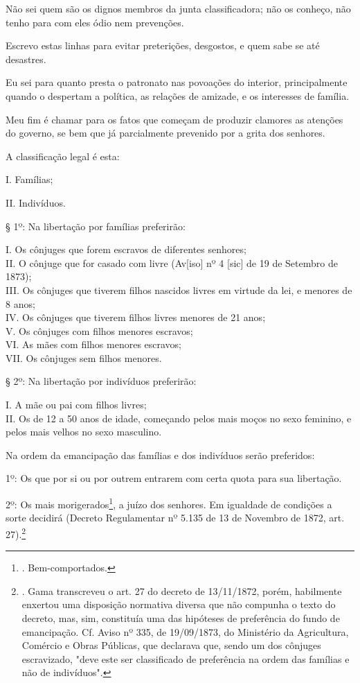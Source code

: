 Não sei quem são os dignos membros da junta classificadora; não os
conheço, não tenho para com eles ódio nem prevenções.

Escrevo estas linhas para evitar preterições, desgostos, e quem sabe se
até desastres.

Eu sei para quanto presta o patronato nas povoações do interior,
principalmente quando o despertam a política, as relações de amizade, e
os interesses de família.

Meu fim é chamar para os fatos que começam de produzir clamores as
atenções do governo, se bem que já parcialmente prevenido por a grita
dos senhores.

A classificação legal é esta:

I. Famílias;

II. Indivíduos.

§ 1º: Na libertação por famílias preferirão:

I. Os cônjuges que forem escravos de diferentes senhores;\\
II. O cônjuge que for casado com livre (Av{[}iso{]} nº 4 {[}sic{]} de 19
de Setembro de 1873);\\
III. Os cônjuges que tiverem filhos nascidos livres em virtude da lei, e
menores de 8 anos;\\
IV. Os cônjuges que tiverem filhos livres menores de 21 anos;\\
V. Os cônjuges com filhos menores escravos;\\
VI. As mães com filhos menores escravos;\\
VII. Os cônjuges sem filhos menores.

§ 2º: Na libertação por indivíduos preferirão:

I. A mãe ou pai com filhos livres;\\
II. Os de 12 a 50 anos de idade, começando pelos mais moços no sexo
feminino, e pelos mais velhos no sexo masculino.

Na ordem da emancipação das famílias e dos indivíduos serão preferidos:

1º: Os que por si ou por outrem entrarem com certa quota para sua
libertação.

2º: Os mais morigerados\footnote{. Bem-comportados.}, a juízo dos
senhores. Em igualdade de condições a sorte decidirá (Decreto
Regulamentar nº 5.135 de 13 de Novembro de 1872, art. 27).\footnote{.
  Gama transcreveu o art. 27 do decreto de 13/11/1872, porém, habilmente
  enxertou uma disposição normativa diversa que não compunha o texto do
  decreto, mas, sim, constituía uma das hipóteses de preferência do
  fundo de emancipação. Cf. Aviso nº 335, de 19/09/1873, do Ministério
  da Agricultura, Comércio e Obras Públicas, que declarava que, sendo um
  dos cônjuges escravizado, "deve este ser classificado de preferência
  na ordem das famílias e não de indivíduos".}

